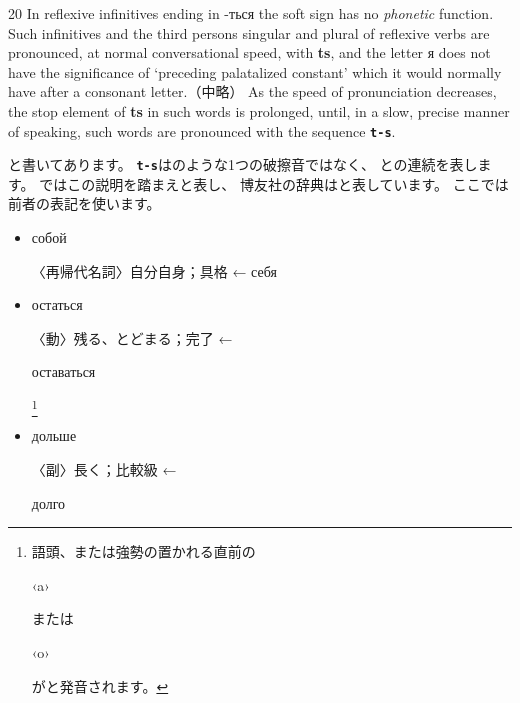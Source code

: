 \documentclass[12pt]{ltjsarticle}
\begin{document}
\bigskip

\begin{indentation}{2\zw}{0\zw}
In reflexive infinitives ending in -ться the soft sign has no \textit{phonetic} function.
Such infinitives and the third persons singular and plural of reflexive verbs are pronounced,
at normal conversational speed, with \textbf{ts},
and the letter я does not have the significance of ‘preceding palatalized constant’ which it would normally have after a consonant letter.（中略）
As the speed of pronunciation decreases,
the stop element of \textbf{ts} in such words is prolonged, until, in a slow, precise manner of speaking, such words are pronounced with the sequence \texttt{\textbf{t-s}}.
\end{indentation}

\bigskip

\noindent と書いてあります。
\texttt{\textbf{t-s}}は\textipa{/\texttslig/}のような1つの破擦音ではなく、
との連続を表します。
\citep{jones2011}ではこの説明を踏まえ\textipa{/{\texttslig}/}と表し、
博友社の辞典はと表しています。
ここでは前者の表記を使います。

\begin{itemize}
    \item \begin{russian}собой\end{russian}  〈再帰代名詞〉自分自身；具格 ← себя 
    \item \begin{russian}остаться\end{russian}  〈動〉残る、とどまる；完了 ← \begin{russian}оставаться\end{russian} \footnote{語頭、または強勢の置かれる直前の \begin{russian}‹a›\end{russian} または \begin{russian}‹o›\end{russian} がと発音されます。}
    \item \begin{russian}дольше\end{russian}  〈副〉長く；比較級 ← \begin{russian}долго\end{russian}
\end{itemize}
\end{document}
